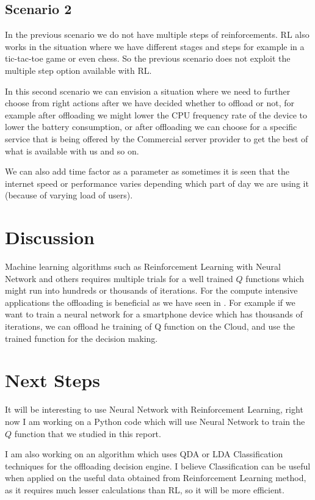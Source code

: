 \documentclass{article}
\begin{document}
\subsection{Scenario 2}
In the previous scenario we do not have multiple steps of reinforcements. RL also works in the situation where we have different stages and steps for example in a tic-tac-toe game or even chess. So the previous scenario does not exploit the multiple step option available with RL.\par
In this second scenario we can envision a situation where we need to further choose from right actions after we have decided whether to offload or not, for example after offloading we might lower the CPU frequency rate of the device to lower the battery consumption, or after offloading we can choose for a specific service that is being offered by the Commercial server provider to get the best of what is available with us and so on.\par
We can also add time factor as a parameter as sometimes it is seen that the internet speed or performance varies depending which part of day we are using it (because of varying load of users).

\section{Discussion}
Machine learning algorithms such as Reinforcement Learning with Neural Network and others requires multiple trials for a well trained $Q$ functions which might run into hundreds or thousands of iterations.
For the compute intensive applications the offloading is beneficial as we have seen in \cite{kumar2010cloud}. For example if we
want to train a neural network for a smartphone device which has thousands of iterations, we
can offload he training of Q function on the Cloud, and use the trained function for the decision making.

\section{Next Steps}
It will be interesting to use Neural Network with Reinforcement Learning, right now I am working on a Python code which will use Neural Network to train the $Q$ function that we studied in this report.\par
I am also working on an algorithm which uses QDA or LDA Classification techniques for the offloading decision engine. I believe Classification can be useful when applied on the useful data obtained from Reinforcement Learning method, as it requires much lesser calculations than RL, so it will be more efficient.
\end{document}
